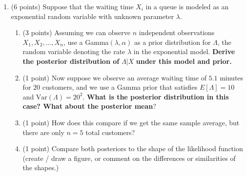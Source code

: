 \documentclass[10pt,twoside]{article}\usepackage[]{graphicx}\usepackage[dvipsnames,svgnames,table]{xcolor}
\begin{document}
\begin{enumerate}
  \item (6 points) Suppose that the waiting time $X_i$ in a queue is modeled as an exponential random variable with unknown parameter $\lambda$.
  
  \begin{enumerate}
    \item (3 points) Assuming we can observe $n$ independent observations $X_1, X_2, \ldots, X_n$, use a Gamma$(\lambda, \alpha)$ as a prior distribution for $\Lambda$, the random variable denoting the rate $\lambda$ in the exponential model. \textbf{Derive the posterior distribution of} $\Lambda | X$ \textbf{under this model and prior.}
    \item (1 point) Now suppose we observe an average waiting time of $5.1$ minutes for $20$ customers, and we use a Gamma prior that satisfies $E[\Lambda] = 10$ and $\text{Var}(\Lambda) = 20^2$. \textbf{What is the posterior distribution in this case? What about the posterior mean}?
    \item (1 point) How does this compare if we get the same sample average, but there are only $n = 5$ total customers?
    \item (1 point) Compare both posteriors to the shape of the likelihood function (create / draw a figure, or comment on the differences or similarities of the shapes.)
  \end{enumerate}
  
\end{enumerate}
\end{document}
